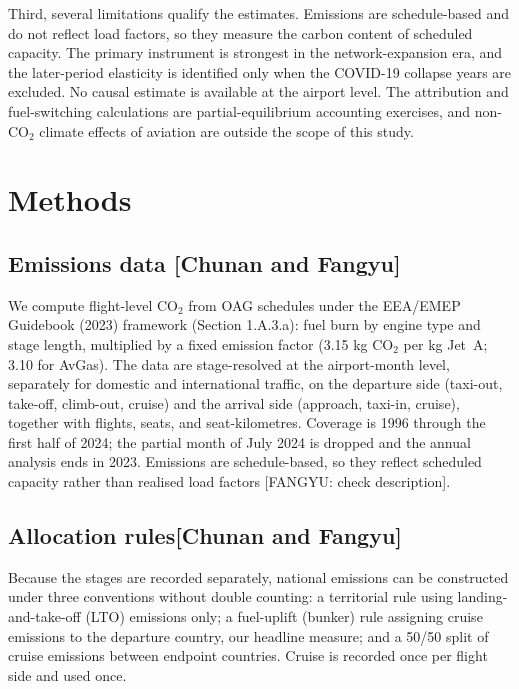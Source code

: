 \documentclass[12pt]{article}
\begin{document}
Third, several limitations qualify the estimates. Emissions are
schedule-based and do not reflect load factors, so they measure the carbon
content of scheduled capacity. The primary instrument is strongest in the
network-expansion era, and the later-period elasticity is identified only
when the COVID-19 collapse years are excluded. No causal estimate is
available at the airport level. The
attribution and fuel-switching calculations are partial-equilibrium
accounting exercises, and non-CO$_2$ climate effects of aviation are
outside the scope of this study.

\section*{Methods}
\subsection*{Emissions data [Chunan and Fangyu]}
We compute flight-level CO$_2$ from OAG schedules under the EEA/EMEP
Guidebook (2023) framework (Section 1.A.3.a): fuel burn by engine type and
stage length, multiplied by a fixed emission factor (3.15 kg CO$_2$ per kg
Jet~A; 3.10 for AvGas). The data are stage-resolved at the airport-month
level, separately for domestic and international traffic, on the departure
side (taxi-out, take-off, climb-out, cruise) and the arrival side
(approach, taxi-in, cruise), together with flights, seats, and
seat-kilometres. Coverage is 1996 through the first half of 2024; the
partial month of July 2024 is dropped and the annual analysis ends in 2023.
Emissions are schedule-based, so they reflect scheduled capacity rather
than realised load factors [FANGYU: check description].

\subsection*{Allocation rules[Chunan and Fangyu]}
Because the stages are recorded separately, national emissions can be
constructed under three conventions without double counting: a territorial
rule using landing-and-take-off (LTO) emissions only; a fuel-uplift
(bunker) rule assigning cruise emissions to the departure country, our
headline measure; and a 50/50 split of cruise emissions between endpoint
countries. Cruise is recorded once per flight side and used once.
\end{document}
